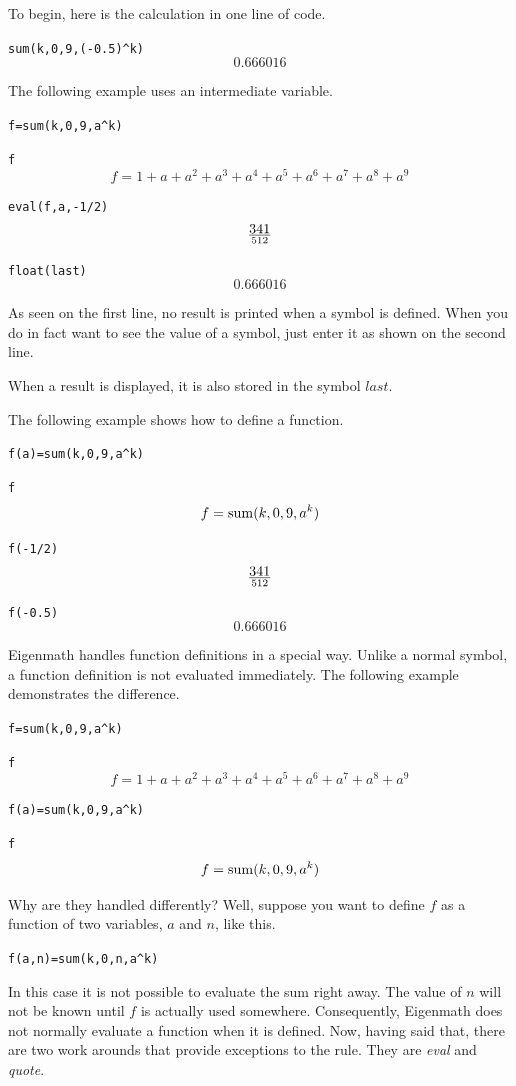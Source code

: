 \documentclass[12pt]{book}
\begin{document}
\medskip
\noindent
To begin, here is the calculation in one line of code.

\medskip
\verb$sum(k,0,9,(-0.5)^k)$
$$0.666016$$

\medskip
\noindent
The following example uses an intermediate variable.

\medskip
\verb$f=sum(k,0,9,a^k)$

\verb$f$
$$f=1+a+a^2+a^3+a^4+a^5+a^6+a^7+a^8+a^9$$

\verb$eval(f,a,-1/2)$
$$341\over512$$

\verb$float(last)$
$$0.666016$$

\medskip
\noindent
As seen on the first line, no result is printed when a symbol is defined.
When you do in fact want to see the value of a symbol,
just enter it as shown on the second line.

\medskip
\noindent
When a result is displayed, it is also stored in the symbol $last$.

\newpage

\noindent
The following example shows how to define a function.

\medskip
\verb$f(a)=sum(k,0,9,a^k)$

\verb$f$
$$f=\mathop{\rm sum}(k,0,9,a^k)$$

\verb$f(-1/2)$
$$341\over512$$

\verb$f(-0.5)$
$$0.666016$$

\medskip
\noindent
Eigenmath handles function definitions in a special way.
Unlike a normal symbol, a function definition is not evaluated immediately.
The following example demonstrates the difference.

\medskip
\verb$f=sum(k,0,9,a^k)$

\verb$f$
$$f=1+a+a^2+a^3+a^4+a^5+a^6+a^7+a^8+a^9$$

\verb$f(a)=sum(k,0,9,a^k)$

\verb$f$
$$f=\mathop{\rm sum}(k,0,9,a^k)$$

\medskip
\noindent
Why are they handled differently?
Well, suppose you want to define $f$ as a function of two variables, $a$ and $n$, like this.

\medskip
\verb$f(a,n)=sum(k,0,n,a^k)$

\medskip
\noindent
In this case it is not possible to evaluate the sum right away.
The value of $n$ will not be known until $f$ is actually used somewhere.
Consequently, Eigenmath does not normally evaluate a function when it is defined.
Now, having said that, there are two work arounds that provide exceptions to the rule.
They are {\it eval} and {\it quote}.
 
\end{document}

